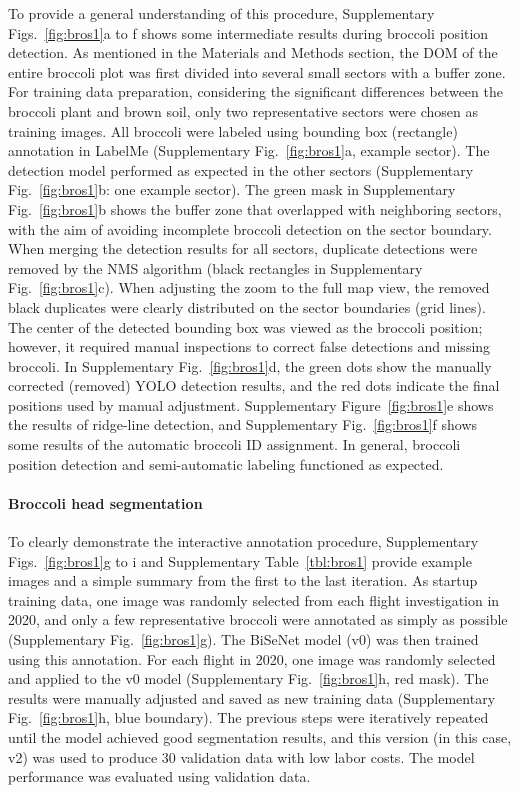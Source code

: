 To provide a general understanding of this procedure, Supplementary Figs.~\ref{fig:bros1}a to f shows some intermediate results during broccoli position detection. As mentioned in the Materials and Methods section, the DOM of the entire broccoli plot was first divided into several small sectors with a buffer zone. For training data preparation, considering the significant differences between the broccoli plant and brown soil, only two representative sectors were chosen as training images. All broccoli were labeled using bounding box (rectangle) annotation in LabelMe (Supplementary Fig.~\ref{fig:bros1}a, example sector). The detection model performed as expected in the other sectors (Supplementary Fig.~\ref{fig:bros1}b: one example sector). The green mask in Supplementary Fig.~\ref{fig:bros1}b shows the buffer zone that overlapped with neighboring sectors, with the aim of avoiding incomplete broccoli detection on the sector boundary. When merging the detection results for all sectors, duplicate detections were removed by the NMS algorithm (black rectangles in Supplementary Fig.~\ref{fig:bros1}c). When adjusting the zoom to the full map view, the removed black duplicates were clearly distributed on the sector boundaries (grid lines). The center of the detected bounding box was viewed as the broccoli position; however, it required manual inspections to correct false detections and missing broccoli. In Supplementary Fig.~\ref{fig:bros1}d, the green dots show the manually corrected (removed) YOLO detection results, and the red dots indicate the final positions used by manual adjustment. Supplementary Figure~\ref{fig:bros1}e shows the results of ridge-line detection, and Supplementary Fig.~\ref{fig:bros1}f shows some results of the automatic broccoli ID assignment. In general, broccoli position detection and semi-automatic labeling functioned as expected.

\paragraph{Broccoli head segmentation}

To clearly demonstrate the interactive annotation procedure, Supplementary Figs.~\ref{fig:bros1}g to i and Supplementary Table~\ref{tbl:bros1} provide example images and a simple summary from the first to the last iteration. As startup training data, one image was randomly selected from each flight investigation in 2020, and only a few representative broccoli were annotated as simply as possible (Supplementary Fig.~\ref{fig:bros1}g). The BiSeNet model (v0) was then trained using this annotation. For each flight in 2020, one image was randomly selected and applied to the v0 model (Supplementary Fig.~\ref{fig:bros1}h, red mask). The results were manually adjusted and saved as new training data (Supplementary Fig.~\ref{fig:bros1}h, blue boundary). The previous steps were iteratively repeated until the model achieved good segmentation results, and this version (in this case, v2) was used to produce 30 validation data with low labor costs. The model performance was evaluated using validation data.

